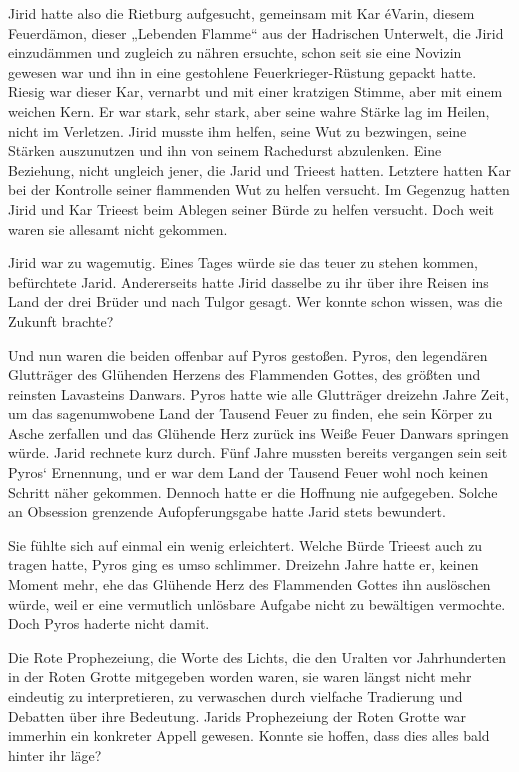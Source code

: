 Jirid hatte also die Rietburg aufgesucht, gemeinsam mit Kar éVarin, diesem Feuerdämon, dieser „Lebenden Flamme“ aus der Hadrischen Unterwelt, die Jirid einzudämmen und zugleich zu nähren ersuchte, schon seit sie eine Novizin gewesen war und ihn in eine gestohlene Feuerkrieger-Rüstung gepackt hatte. Riesig war dieser Kar, vernarbt und mit einer kratzigen Stimme, aber mit einem weichen Kern. Er war stark, sehr stark, aber seine wahre Stärke lag im Heilen, nicht im Verletzen. Jirid musste ihm helfen, seine Wut zu bezwingen, seine Stärken auszunutzen und ihn von seinem Rachedurst abzulenken. Eine Beziehung, nicht ungleich jener, die Jarid und Trieest hatten. Letztere hatten Kar bei der Kontrolle seiner flammenden Wut zu helfen versucht. Im Gegenzug hatten Jirid und Kar Trieest beim Ablegen seiner Bürde zu helfen versucht. Doch weit waren sie allesamt nicht gekommen.

Jirid war zu wagemutig. Eines Tages würde sie das teuer zu stehen kommen, befürchtete Jarid. Andererseits hatte Jirid dasselbe zu ihr über ihre Reisen ins Land der drei Brüder und nach Tulgor gesagt. Wer konnte schon wissen, was die Zukunft brachte?

Und nun waren die beiden offenbar auf Pyros gestoßen. Pyros, den legendären Glutträger des Glühenden Herzens des Flammenden Gottes, des größten und reinsten Lavasteins Danwars. Pyros hatte wie alle Glutträger dreizehn Jahre Zeit, um das sagenumwobene Land der Tausend Feuer zu finden, ehe sein Körper zu Asche zerfallen und das Glühende Herz zurück ins Weiße Feuer Danwars springen würde. Jarid rechnete kurz durch. Fünf Jahre mussten bereits vergangen sein seit Pyros‘ Ernennung, und er war dem Land der Tausend Feuer wohl noch keinen Schritt näher gekommen. Dennoch hatte er die Hoffnung nie aufgegeben. Solche an Obsession grenzende Aufopferungsgabe hatte Jarid stets bewundert.

Sie fühlte sich auf einmal ein wenig erleichtert. Welche Bürde Trieest auch zu tragen hatte, Pyros ging es umso schlimmer. Dreizehn Jahre hatte er, keinen Moment mehr, ehe das Glühende Herz des Flammenden Gottes ihn auslöschen würde, weil er eine vermutlich unlösbare Aufgabe nicht zu bewältigen vermochte. Doch Pyros haderte nicht damit.

Die Rote Prophezeiung, die Worte des Lichts, die den Uralten vor Jahrhunderten in der Roten Grotte mitgegeben worden waren, sie waren längst nicht mehr eindeutig zu interpretieren, zu verwaschen durch vielfache Tradierung und Debatten über ihre Bedeutung. Jarids Prophezeiung der Roten Grotte war immerhin ein konkreter Appell gewesen. Konnte sie hoffen, dass dies alles bald hinter ihr läge?

